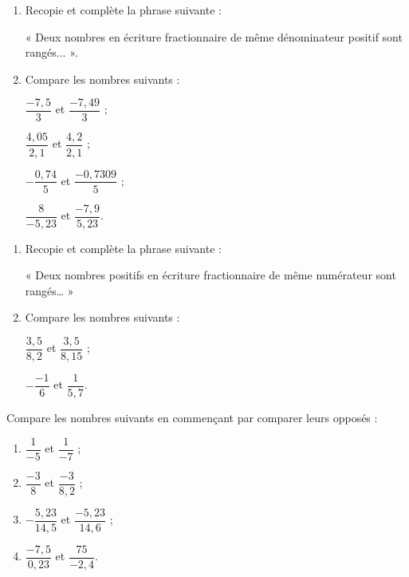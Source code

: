 \begin{exercice}
\begin{enumerate}
\item Recopie et complète la phrase suivante :

« Deux nombres en écriture fractionnaire de même dénominateur positif sont rangés... ».
\item Compare les nombres suivants :

$\dfrac{-7,5}{3}$ et $\dfrac{-7,49}{3}$ ;

$\dfrac{4,05}{2,1}$ et $\dfrac{4,2}{2,1}$ ;

$-\dfrac{0,74}{5}$ et $\dfrac{-0,7309}{5}$ ; 

$\dfrac{8}{-5,23}$ et $\dfrac{-7,9}{5,23}$. 
\end{enumerate}
\end{exercice}





\begin{exercice}
\begin{enumerate}
\item Recopie et complète la phrase suivante :

« Deux nombres positifs en écriture fractionnaire de même numérateur sont rangés… »
\item Compare les nombres suivants :

$\dfrac{3,5}{8,2}$ et $\dfrac{3,5}{8,15}$ ;

$-\dfrac{-1}{6}$ et $\dfrac{1}{5,7}$.
\end{enumerate}
\end{exercice}




\begin{exercice}
Compare les nombres suivants en commençant par comparer leurs opposés :
\begin{enumerate}
\item $\dfrac{1}{-5}$ et $\dfrac{1}{-7}$ ;
\item $\dfrac{-3}{8}$ et $\dfrac{-3}{8,2}$ ;
\item $-\dfrac{5,23}{14,5}$ et $\dfrac{-5,23}{14,6}$ ;
\item $\dfrac{-7,5}{0,23}$ et $\dfrac{75}{-2,4}$. 
\end{enumerate}
\end{exercice}





